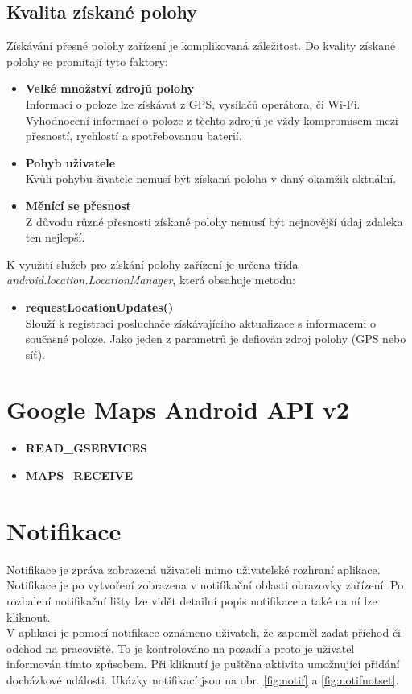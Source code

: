 \documentclass{diplomka}
\begin{document}
\subsection*{Kvalita získané polohy}
Získávání přesné polohy zařízení je komplikovaná záležitost. Do kvality získané polohy se promítají tyto faktory:
\begin{itemize}[]
\item \textbf{Velké množství zdrojů polohy}\\
Informaci o poloze lze získávat z GPS, vysílačů operátora, či Wi-Fi. Vyhodnocení informací o poloze z těchto zdrojů je vždy kompromisem mezi přesností, rychlostí a spotřebovanou baterií.
\item \textbf{Pohyb uživatele}\\
Kvůli pohybu živatele nemusí být získaná poloha v daný okamžik aktuální.
\item \textbf{Měnící se přesnost}\\
Z důvodu různé přesnosti získané polohy nemusí být nejnovější údaj zdaleka ten nejlepší.
\end{itemize}
\noindent
K využití služeb pro získání polohy zařízení je určena třída\\ \emph{android.location.LocationManager}, která obsahuje metodu:
\begin{itemize}[]
\item \textbf{requestLocationUpdates()}\\
Slouží k registraci posluchače získávajícího aktualizace s informacemi o současné poloze. Jako jeden z parametrů je defiován zdroj polohy (GPS nebo síť).
\end{itemize}


\section{Google Maps Android API v2}


\begin{itemize}[noitemsep,nolistsep]
\item  \textbf{READ\_GSERVICES}
\end{itemize}

\begin{itemize}[noitemsep,nolistsep]
\item  \textbf{MAPS\_RECEIVE}
\end{itemize}

\section{Notifikace}
Notifikace je zpráva zobrazená uživateli mimo uživatelské rozhraní aplikace. Notifikace je po vytvoření zobrazena v notifikační oblasti obrazovky zařízení. Po rozbalení notifikační lišty lze vidět detailní popis notifikace a také na ní lze kliknout.
\\ \indent
V aplikaci je pomocí notifikace oznámeno uživateli, že zapoměl zadat příchod či odchod na pracoviště. To je kontrolováno na pozadí a proto je uživatel informován tímto způsobem. Při kliknutí je puštěna aktivita umožnující přidání docházkové události.
Ukázky notifikací jsou na obr. \ref{fig:notif} a \ref{fig:notifnotset}.
\end{document}
